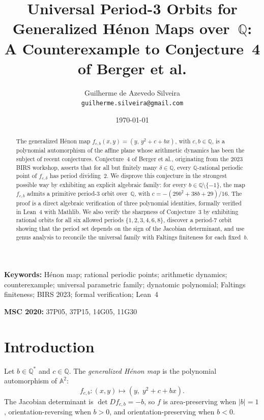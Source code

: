 \documentclass[11pt]{article}
\title{Universal Period-3 Orbits for Generalized H\'enon Maps over~$\mathbb{Q}$:\\
A Counterexample to Conjecture~4 of Berger et al.}
\author{Guilherme de Azevedo Silveira\\
\texttt{guilherme.silveira@gmail.com}}
\date{\today}
\theoremstyle{definition}
\theoremstyle{remark}
\begin{document}
\maketitle

\begin{abstract}
The generalized H\'enon map $f_{c,b}(x,y) = (y,\, y^2 + c + bx)$, with
$c, b \in \mathbb{Q}$, is a polynomial automorphism of the affine plane whose
arithmetic dynamics has been the subject of recent conjectures.
Conjecture~4 of Berger et al., originating from the
2023 BIRS workshop, asserts that for all but finitely many $\delta \in \mathbb{Q}$,
every $\mathbb{Q}$-rational periodic point of $f_{c,\delta}$ has period dividing~$2$.
We disprove this conjecture in the strongest possible way by exhibiting an explicit
algebraic family: for every $b \in \mathbb{Q} \setminus \{-1\}$, the map $f_{c,b}$
admits a primitive period-$3$ orbit over~$\mathbb{Q}$, with
$c = -(29b^2 + 38b + 29)/16$.
The proof is a direct algebraic verification of three polynomial identities,
formally verified in Lean~4 with Mathlib.
We also verify the sharpness of Conjecture~3 by exhibiting rational
orbits for all six allowed periods $\{1,2,3,4,6,8\}$, discover a period-$7$ orbit
showing that the period set depends on the sign of the Jacobian determinant,
and use genus analysis to reconcile the universal family with Faltings finiteness
for each fixed~$b$.
\end{abstract}

\medskip
\noindent\textbf{Keywords:} H\'enon map; rational periodic points; arithmetic dynamics;
counterexample; universal parametric family; dynatomic polynomial; Faltings finiteness;
BIRS 2023; formal verification; Lean~4

\medskip
\noindent\textbf{MSC 2020:} 37P05, 37P15, 14G05, 11G30


\section{Introduction}
\label{sec:intro}

Let $b \in \mathbb{Q}^*$ and $c \in \mathbb{Q}$. The \emph{generalized H\'enon map}
is the polynomial automorphism of $\mathbb{A}^2$:
%
\begin{equation}\label{eq:henon}
  f_{c,b}\colon (x,y) \longmapsto (y,\; y^2 + c + bx).
\end{equation}
%
The Jacobian determinant is $\det Df_{c,b} = -b$, so $f$ is area-preserving when
$|b| = 1$, orientation-reversing when $b > 0$, and orientation-preserving when $b < 0$.
\end{document}
